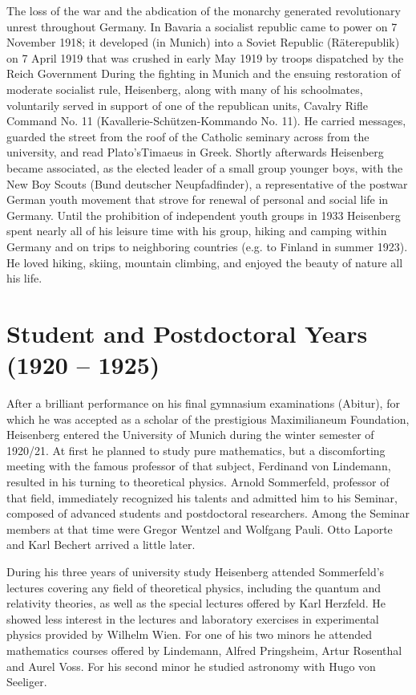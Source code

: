 \documentclass{article}
\begin{document}
The loss of the war and the abdication of the monarchy generated revolutionary unrest throughout Germany. In Bavaria a socialist republic came to power on 7 November 1918; it developed (in Munich) into a Soviet Republic (Räterepublik) on 7 April 1919 that was crushed in early May 1919 by troops dispatched by the Reich Government During the fighting in Munich and the ensuing restoration of moderate socialist rule, Heisenberg, along with many of his schoolmates, voluntarily served in support of one of the republican units, Cavalry Rifle Command No. 11 (Kavallerie-Schützen-Kommando No. 11). He carried messages, guarded the street from the roof of the Catholic seminary across from the university, and read Plato'sTimaeus in Greek. Shortly afterwards Heisenberg became associated, as the elected leader of a small group younger boys, with the New Boy Scouts (Bund deutscher Neupfadfinder), a representative of the postwar German youth movement that strove for renewal of personal and social life in Germany. Until the prohibition of independent youth groups in 1933 Heisenberg spent nearly all of his leisure time with his group, hiking and camping within Germany and on trips to neighboring countries (e.g. to Finland in summer 1923). He loved hiking, skiing, mountain climbing, and enjoyed the beauty of nature all his life.

\section{Student and Postdoctoral Years (1920 – 1925)}

After a brilliant performance on his final gymnasium examinations (Abitur), for which he was accepted as a scholar of the prestigious Maximilianeum Foundation, Heisenberg entered the University of Munich during the winter semester of 1920/21. At first he planned to study pure mathematics, but a discomforting meeting with the famous professor of that subject, Ferdinand von Lindemann, resulted in his turning to theoretical physics. Arnold Sommerfeld, professor of that field, immediately recognized his talents and admitted him to his Seminar, composed of advanced students and postdoctoral researchers. Among the Seminar members at that time were Gregor Wentzel and Wolfgang Pauli. Otto Laporte and Karl Bechert arrived a little later.

During his three years of university study Heisenberg attended Sommerfeld's lectures covering any field of theoretical physics, including the quantum and relativity theories, as well as the special lectures offered by Karl Herzfeld. He showed less interest in the lectures and laboratory exercises in experimental physics provided by Wilhelm Wien. For one of his two minors he attended mathematics courses offered by Lindemann, Alfred Pringsheim, Artur Rosenthal and Aurel Voss. For his second minor he studied astronomy with Hugo von Seeliger.
\end{document}
